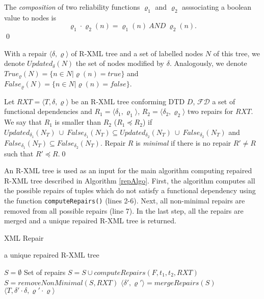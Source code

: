 \begin{define}\label{compVarrho}
The {\sl composition} of two reliability functions $\varrho_1$ and $\varrho_2$ asssociating a boolean value to nodes is $$\varrho_1 \cdot \varrho_2(n) = \varrho_1(n)\ AND\ \varrho_2(n).$$\qed
\end{define}


With a repair $\langle \delta, \varrho \rangle$ of R-XML tree and a set of labelled nodes $N$ of this tree, we denote  $Updated_{\delta}(N)$ the set of nodes modified by $\delta$. Analogously, we denote $True_{\varrho}(N) = \{n \in N| \varrho(n) = true\}$ and $False_{\varrho}(N) =\{n \in N | \varrho(n) = false\}$.

\begin{define}
Let $RXT = \langle T, \delta, \varrho \rangle$ be an R-XML tree conforming DTD $D$, $\mathcal{FD}$ a set of functional dependencies and $R_1 = \langle \delta_1, \varrho_1 \rangle$, $R_2 = \langle \delta_2, \varrho_2 \rangle$ two repairs for $RXT$. We say that $R_1$ is smaller than $R_2$ ($R_1 \preceq R_2$) if $Updated_{\delta_1}(N_T)\ \cup\ False_{\delta_1}(N_T) \subseteq Updated_{\delta_2}(N_T)\ \cup\ False_{\delta_2}(N_T)$ and $False_{\delta_1}(N_T) \subseteq False_{\delta_2}(N_T)$. Repair $R$ is {\sl minimal} if there is no repair $R' \neq R$ such that $R' \preceq R$.\qed
\end{define}

An R-XML tree is used as an input for the main algorithm computing repaired R-XML tree described in Algorithm \ref{repAlgo}. First, the algorithm computes all the possible repairs of tuples which do not satisfy a functional dependency using the function \texttt{computeRepairs()} (lines 2-6). Next, all non-minimal repairs are removed from all possible repairs (line 7). In the last step, all the repairs are merged and a unique repaired R-XML tree is returned.

\begin{algorithm}[H]
\caption{XML Repair}
\label{repAlgo}
\begin{algorithmic}[1]
\ENSURE a unique repaired R-XML tree

\STATE $S = \emptyset$ \COMMENT Set of repairs
		\STATE $S = S \cup computeRepairs(F, t_1, t_2, RXT)$
	\ENDFOR
\ENDFOR
\STATE $S = removeNonMinimal(S, RXT)$
\STATE $\langle \delta', \varrho' \rangle = mergeRepairs(S)$
\RETURN $\langle T, \delta' \cdot \delta, \varrho' \cdot \varrho \rangle$
\end{algorithmic}
\end{algorithm}

